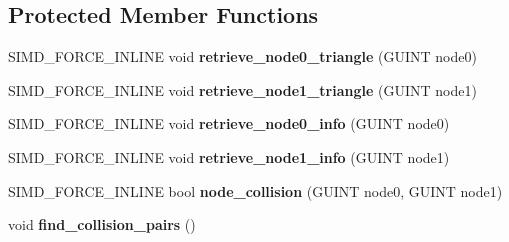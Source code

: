 \subsection*{Protected Member Functions}
\begin{DoxyCompactItemize}
\item 
\hypertarget{class_g_i_m___t_r_e_e___t_r_e_e___c_o_l_l_i_d_e_r_a1a48ca83a2a79ab747bfc64211a83f41}{S\+I\+M\+D\+\_\+\+F\+O\+R\+C\+E\+\_\+\+I\+N\+L\+I\+N\+E void {\bfseries retrieve\+\_\+node0\+\_\+triangle} (G\+U\+I\+N\+T node0)}\label{class_g_i_m___t_r_e_e___t_r_e_e___c_o_l_l_i_d_e_r_a1a48ca83a2a79ab747bfc64211a83f41}

\item 
\hypertarget{class_g_i_m___t_r_e_e___t_r_e_e___c_o_l_l_i_d_e_r_a1d6f27f439686db84f925db43ec9bae6}{S\+I\+M\+D\+\_\+\+F\+O\+R\+C\+E\+\_\+\+I\+N\+L\+I\+N\+E void {\bfseries retrieve\+\_\+node1\+\_\+triangle} (G\+U\+I\+N\+T node1)}\label{class_g_i_m___t_r_e_e___t_r_e_e___c_o_l_l_i_d_e_r_a1d6f27f439686db84f925db43ec9bae6}

\item 
\hypertarget{class_g_i_m___t_r_e_e___t_r_e_e___c_o_l_l_i_d_e_r_a59ceb8b0c49c0b5ef0d8a967f166c15c}{S\+I\+M\+D\+\_\+\+F\+O\+R\+C\+E\+\_\+\+I\+N\+L\+I\+N\+E void {\bfseries retrieve\+\_\+node0\+\_\+info} (G\+U\+I\+N\+T node0)}\label{class_g_i_m___t_r_e_e___t_r_e_e___c_o_l_l_i_d_e_r_a59ceb8b0c49c0b5ef0d8a967f166c15c}

\item 
\hypertarget{class_g_i_m___t_r_e_e___t_r_e_e___c_o_l_l_i_d_e_r_aa516f21e2bb2fb59112700ee3fac660f}{S\+I\+M\+D\+\_\+\+F\+O\+R\+C\+E\+\_\+\+I\+N\+L\+I\+N\+E void {\bfseries retrieve\+\_\+node1\+\_\+info} (G\+U\+I\+N\+T node1)}\label{class_g_i_m___t_r_e_e___t_r_e_e___c_o_l_l_i_d_e_r_aa516f21e2bb2fb59112700ee3fac660f}

\item 
\hypertarget{class_g_i_m___t_r_e_e___t_r_e_e___c_o_l_l_i_d_e_r_a7c4233b51e834c5ccbdd22f5dd7ff55d}{S\+I\+M\+D\+\_\+\+F\+O\+R\+C\+E\+\_\+\+I\+N\+L\+I\+N\+E bool {\bfseries node\+\_\+collision} (G\+U\+I\+N\+T node0, G\+U\+I\+N\+T node1)}\label{class_g_i_m___t_r_e_e___t_r_e_e___c_o_l_l_i_d_e_r_a7c4233b51e834c5ccbdd22f5dd7ff55d}

\item 
\hypertarget{class_g_i_m___t_r_e_e___t_r_e_e___c_o_l_l_i_d_e_r_a7567c0cde6b2271a48661bfe7c5b162d}{void {\bfseries find\+\_\+collision\+\_\+pairs} ()}\label{class_g_i_m___t_r_e_e___t_r_e_e___c_o_l_l_i_d_e_r_a7567c0cde6b2271a48661bfe7c5b162d}

\end{DoxyCompactItemize}


